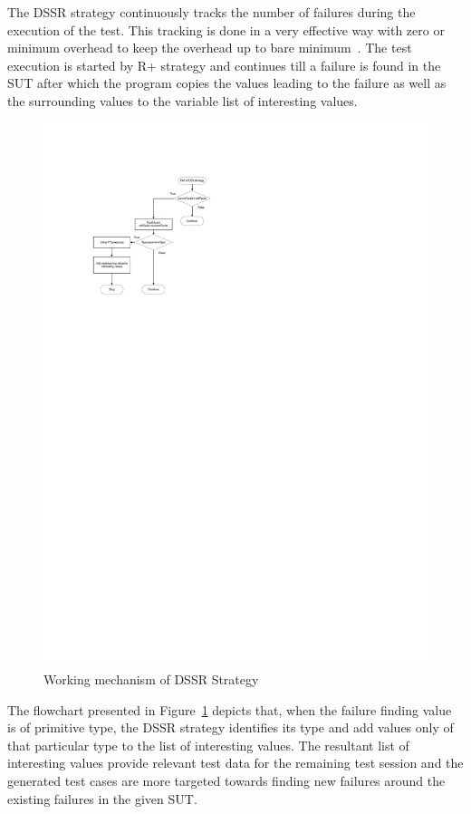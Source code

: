 \documentclass[conference]{IEEEtran}
\begin{document}
The DSSR strategy continuously tracks the number of failures during the execution of the test. This tracking is done in a very effective way with zero or minimum overhead to keep the overhead up to bare minimum~\cite{Leitner2009}. The test execution is started by R+ strategy and continues till a failure is found in the SUT after which the program copies the values leading to the failure as well as the surrounding values to the variable list of interesting values. 

\begin{figure}[ht]
\centering
\includegraphics[width=\columnwidth]{flowchart1.pdf}
\caption{Working mechanism of DSSR Strategy}
\label{fig:Working_DSSS}
\end{figure}

The flowchart presented in Figure~\ref{fig:Working_DSSS} depicts that, when the failure finding value is of primitive type, the DSSR strategy identifies its type and add values only of that particular type to the list of interesting values. The resultant list of interesting values provide relevant test data for the remaining test session and the generated test cases are more targeted towards finding new failures around the existing failures in the given SUT.
\end{document}
